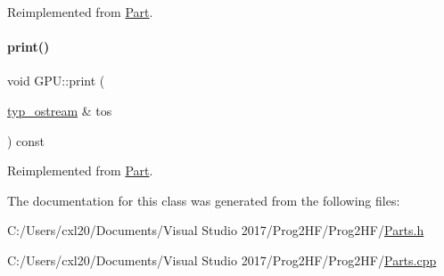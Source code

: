 Reimplemented from \mbox{\hyperlink{class_part_aa602d876151b63db72cf8f666847a8cd}{Part}}.

\mbox{\label{class_g_p_u_ad54f6d21007e216f27dc738aea2de836}} 
\paragraph{\texorpdfstring{print()}{print()}\hspace{0.1cm}{\footnotesize\ttfamily [4/4]}}
{\footnotesize\ttfamily void G\+P\+U\+::print (\begin{DoxyParamCaption}\item[{\mbox{\hyperlink{structtyp__ostream}{typ\+\_\+ostream}} \&}]{tos }\end{DoxyParamCaption}) const\hspace{0.3cm}{\ttfamily [virtual]}}



Reimplemented from \mbox{\hyperlink{class_part_ab6396030e8b7a724731a8b54bd4942fc}{Part}}.



The documentation for this class was generated from the following files\+:\begin{DoxyCompactItemize}
\item 
C\+:/\+Users/cxl20/\+Documents/\+Visual Studio 2017/\+Prog2\+H\+F/\+Prog2\+H\+F/\mbox{\hyperlink{_parts_8h}{Parts.\+h}}\item 
C\+:/\+Users/cxl20/\+Documents/\+Visual Studio 2017/\+Prog2\+H\+F/\+Prog2\+H\+F/\mbox{\hyperlink{_parts_8cpp}{Parts.\+cpp}}\end{DoxyCompactItemize}
